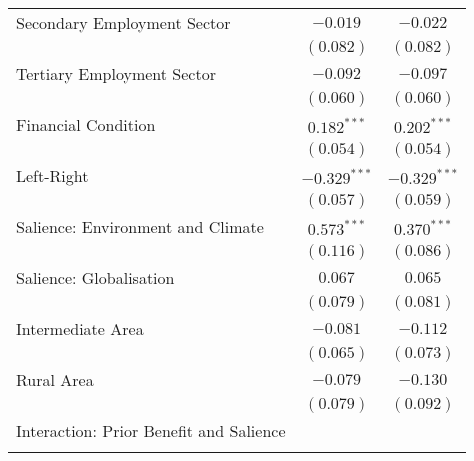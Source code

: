 \begin{center}
\begin{tiny}
\begin{longtable}{l@{} c@{} c@{}}
\quad Secondary Employment Sector                                        & $-0.019$         & $-0.022$       \\
                                                                         & $(0.082)$        & $(0.082)$      \\
\quad Tertiary Employment Sector                                         & $-0.092$         & $-0.097$       \\
                                                                         & $(0.060)$        & $(0.060)$      \\
\quad Financial Condition                                                & $0.182^{***}$    & $0.202^{***}$  \\
                                                                         & $(0.054)$        & $(0.054)$      \\
\quad Left-Right                                                         & $-0.329^{***}$   & $-0.329^{***}$ \\
                                                                         & $(0.057)$        & $(0.059)$      \\
\quad Salience: Environment and Climate                                  & $0.573^{***}$    & $0.370^{***}$  \\
                                                                         & $(0.116)$        & $(0.086)$      \\
\quad Salience: Globalisation                                            & $0.067$          & $0.065$        \\
                                                                         & $(0.079)$        & $(0.081)$      \\
\quad Intermediate Area                                                  & $-0.081$         & $-0.112$       \\
                                                                         & $(0.065)$        & $(0.073)$      \\
\quad Rural Area                                                         & $-0.079$         & $-0.130$       \\
                                                                         & $(0.079)$        & $(0.092)$      \\
Interaction: Prior Benefit and Salience                                  &                  &                \\
                                                                         &                  &                \\

\end{longtable}
\end{tiny}
\end{center}
